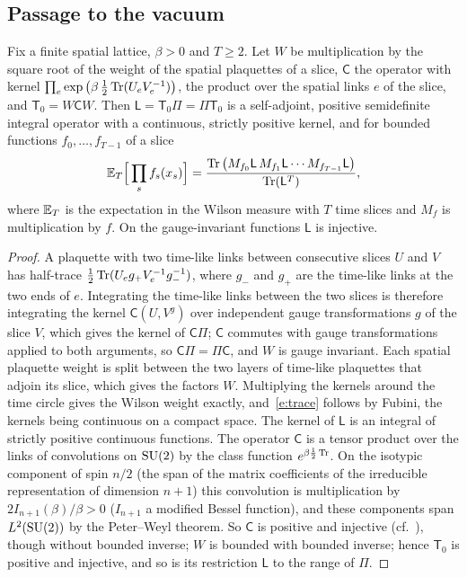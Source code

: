 \subsection{Passage to the vacuum}
\begin{lemma}\label{l:trace}
Fix a finite spatial lattice, $\beta>0$ and $T\ge2$. Let $W$ be multiplication by the square root of the
weight of the spatial plaquettes of a slice, $\mathsf C$ the operator with kernel
$\prod_e\exp\big(\beta\,\tfrac12\operatorname{Tr}(U_eV_e^{-1})\big)$, the product over the spatial links $e$ of the slice, and
$\mathsf T_0=W\mathsf CW$. Then $\mathsf L=\mathsf T_0\Pi=\Pi\mathsf T_0$ is a self-adjoint, positive semidefinite
integral operator with a continuous, strictly positive kernel, and for bounded functions
$f_0,\dots,f_{T-1}$ of a slice
\begin{equation}\label{e:trace}
\mathbb{E}_T\Big[\prod_{s}f_s(x_s)\Big]=\frac{\operatorname{Tr}\big(M_{f_0}\mathsf L\,M_{f_1}\mathsf L\cdots M_{f_{T-1}}\mathsf L\big)}{\operatorname{Tr}(\mathsf L^T)},
\end{equation}
where $\mathbb{E}_T$ is the expectation in the Wilson measure with $T$ time slices and $M_f$ is multiplication by
$f$. On the gauge-invariant functions $\mathsf L$ is injective.
\end{lemma}
\begin{proof}
A plaquette with two time-like links between consecutive slices $U$ and $V$ has half-trace
$\tfrac12\operatorname{Tr}(U_eg_{+}V_e^{-1}g_{-}^{-1})$, where $g_-$ and $g_+$ are the time-like links at the two ends of $e$. Integrating the
time-like links between the two slices is therefore integrating the kernel $\mathsf C(U,V^g)$ over independent gauge
transformations $g$ of the slice $V$, which gives the kernel of $\mathsf C\Pi$; $\mathsf C$ commutes with gauge transformations
applied to both arguments, so $\mathsf C\Pi=\Pi\mathsf C$, and $W$ is gauge invariant. Each spatial plaquette weight is split
between the two layers of time-like plaquettes that adjoin its slice, which gives the factors $W$. Multiplying the kernels around the
time circle gives the Wilson weight exactly, and~\eqref{e:trace} follows by Fubini, the kernels being
continuous on a compact space. The kernel of $\mathsf L$ is an integral of strictly positive continuous
functions. The operator $\mathsf C$ is a tensor product over the links of convolutions on $\mathrm{SU}(2)$ by the class function
$e^{\beta\frac12\operatorname{Tr}}$. On the isotypic component of spin $n/2$ (the span of the matrix coefficients of the irreducible
representation of dimension $n+1$) this convolution is multiplication by
$2I_{n+1}(\beta)/\beta>0$ ($I_{n+1}$ a modified Bessel function), and these components span $L^2(\mathrm{SU}(2))$ by the
Peter--Weyl theorem. So $\mathsf C$ is positive and injective (cf.~\cite{Lu77}), though without bounded inverse; $W$ is bounded with bounded inverse; hence
$\mathsf T_0$ is positive and injective, and so is its restriction $\mathsf L$ to the range of $\Pi$.
\end{proof}

